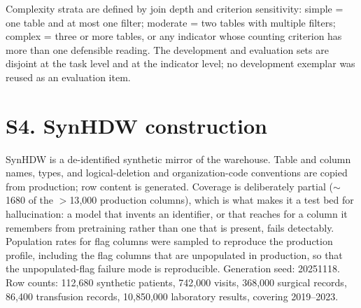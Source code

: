 \documentclass[10pt]{article}
\begin{document}
\noindent
Complexity strata are defined by join depth and criterion sensitivity: simple =
one table and at most one filter; moderate = two tables with multiple filters;
complex = three or more tables, or any indicator whose counting criterion has
more than one defensible reading. The development and evaluation sets are
disjoint at the task level and at the indicator level; no development exemplar
was reused as an evaluation item.

\section{S4. SynHDW construction}
SynHDW is a de-identified synthetic mirror of the warehouse. Table and column
names, types, and logical-deletion and organization-code conventions are copied
from production; row content is generated. Coverage is deliberately partial
($\sim$1680 of the $>$13{,}000 production columns), which is what makes it a test
bed for hallucination: a model that invents an identifier, or that reaches for a
column it remembers from pretraining rather than one that is present, fails
detectably. Population rates for flag columns were sampled to reproduce the
production profile, including the flag columns that are unpopulated in
production, so that the unpopulated-flag failure mode is reproducible.
Generation seed: 20251118. Row counts: 112{,}680 synthetic patients, 742{,}000 visits, 368{,}000 surgical records, 86{,}400 transfusion records, 10{,}850{,}000 laboratory results, covering 2019--2023.

\end{document}
